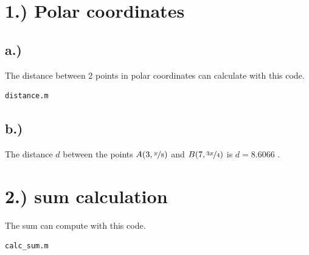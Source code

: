 \documentclass{scrartcl}
\begin{document}
\pagestyle{fancy}
\section*{1.) Polar coordinates}
\subsection*{a.)}
The distance between 2 points in polar coordinates can calculate with this code.

\begin{Verbatim}[frame=bottomline]
distance.m
\end{Verbatim}


\subsection*{b.)}
The distance $ d $ between the points $A(3, \nicefrac{\pi}{8})$ and $B(7, \nicefrac{3\pi}{4})$ is $ d = 8.6066 $ .

\section*{2.) sum calculation}
The sum can compute with this code. 

\begin{Verbatim}[frame=bottomline]
calc_sum.m
\end{Verbatim} 

\end{document}
